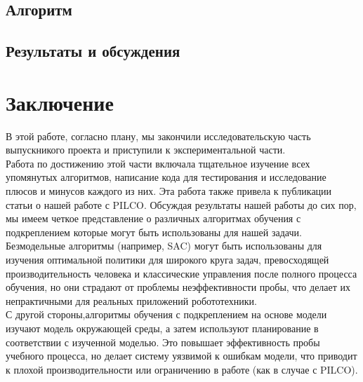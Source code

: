 \documentclass[a4paper,12pt]{article}
\begin{document}
\newpage
\subsection{Алгоритм}
\newpage
\subsection{Результаты и обсуждения}
\newpage
\section{Заключение}
В этой работе, согласно плану, мы закончили исследовательскую часть выпускникого проекта и приступили к экспериментальной части.\\

Работа по достижению этой части включала тщательное изучение всех упомянутых алгоритмов, написание кода для тестирования и исследование плюсов и минусов каждого из них. Эта работа также привела к публикации статьи о нашей работе с PILCO.
Обсуждая результаты нашей работы до сих пор, мы имеем четкое представление о различных алгоритмах обучения с подкреплением которые могут быть использованы для нашей задачи.\\

Безмодельные алгоритмы (например, SAC) могут быть использованы для изучения оптимальной политики для широкого круга задач, превосходящей производительность человека и классические управления после полного процесса обучения, но они страдают от проблемы неэффективности пробы, что делает их непрактичными для реальных приложений робототехники. \\

С другой стороны,алгоритмы обучения с подкреплением на основе модели изучают модель окружающей среды, а затем используют планирование в соответствии с изученной моделью. Это повышает эффективность пробы учебного процесса, но делает систему уязвимой к ошибкам модели, что приводит к плохой производительности или ограничению в работе (как в случае с PILCO).\\
\end{document}

